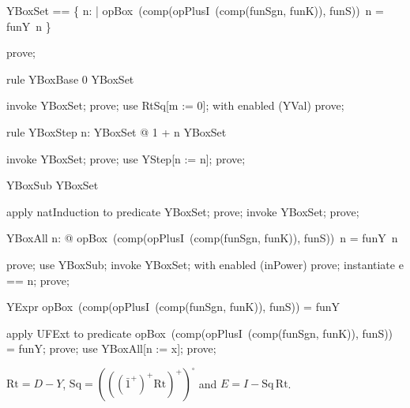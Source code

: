 \documentclass{article}
\begin{document}
\begin{zed}
  YBoxSet == \{ n: \nat | opBox~(comp(opPlusI~(comp(funSgn, funK)), funS))~n = funY~n \}
\end{zed}

\begin{zproof}
prove;
\end{zproof}

\begin{theorem}{rule YBoxBase}
  0 \in YBoxSet
\end{theorem}

\begin{zproof}
invoke YBoxSet;
prove;
use RtSq[m := 0];
with enabled (YVal) prove;
\end{zproof}

\begin{theorem}{rule YBoxStep}
  \forall n: YBoxSet @ 1 + n \in YBoxSet
\end{theorem}

\begin{zproof}
invoke YBoxSet;
prove;
use YStep[n := n];
prove;
\end{zproof}

\begin{theorem}{YBoxSub}
  \nat \subseteq YBoxSet
\end{theorem}

\begin{zproof}
apply natInduction to predicate \nat \subseteq YBoxSet;
prove;
invoke YBoxSet;
prove;
\end{zproof}

\begin{theorem}{YBoxAll}
  \forall n: \nat @ opBox~(comp(opPlusI~(comp(funSgn, funK)), funS))~n = funY~n
\end{theorem}

\begin{zproof}
prove;
use YBoxSub;
invoke YBoxSet;
with enabled (inPower) prove;
instantiate e == n;
prove;
\end{zproof}

\begin{theorem}{YExpr}
  opBox~(comp(opPlusI~(comp(funSgn, funK)), funS)) = funY
\end{theorem}

\begin{zproof}
apply UFExt to predicate opBox~(comp(opPlusI~(comp(funSgn, funK)), funS)) = funY;
prove;
use YBoxAll[n := x];
prove;
\end{zproof}

$\mathrm{Rt} = D - Y$, $\mathrm{Sq} = (((\bar 1^+)^+ \mathrm{Rt})^+)^\square$ and $E = I - \mathrm{Sq}\,\mathrm{Rt}$.
\end{document}
